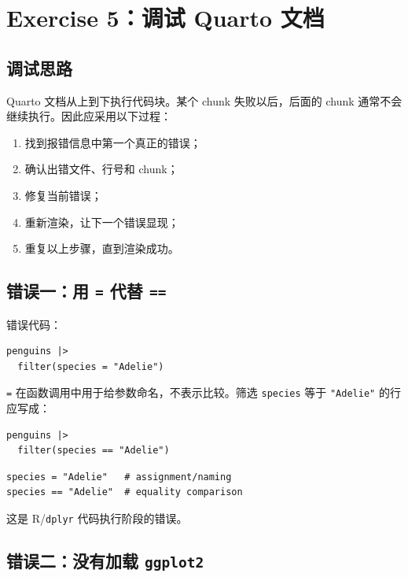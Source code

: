 \documentclass[11pt,a4paper]{ctexart}
\begin{document}
\section{Exercise 5：调试 Quarto 文档}

\subsection{调试思路}

Quarto 文档从上到下执行代码块。某个 chunk 失败以后，后面的 chunk
通常不会继续执行。因此应采用以下过程：

\begin{enumerate}
  \item 找到报错信息中第一个真正的错误；
  \item 确认出错文件、行号和 chunk；
  \item 修复当前错误；
  \item 重新渲染，让下一个错误显现；
  \item 重复以上步骤，直到渲染成功。
\end{enumerate}

\subsection{错误一：用 \texttt{=} 代替 \texttt{==}}

错误代码：

\begin{lstlisting}[style=rcode]
penguins |>
  filter(species = "Adelie")
\end{lstlisting}

\lstinline|=| 在函数调用中用于给参数命名，不表示比较。筛选
\lstinline|species| 等于 \lstinline|"Adelie"| 的行应写成：

\begin{lstlisting}[style=rcode]
penguins |>
  filter(species == "Adelie")
\end{lstlisting}

\begin{lstlisting}[style=textcode]
species = "Adelie"   # assignment/naming
species == "Adelie"  # equality comparison
\end{lstlisting}

这是 R/\texttt{dplyr} 代码执行阶段的错误。

\subsection{错误二：没有加载 \texttt{ggplot2}}
\end{document}
